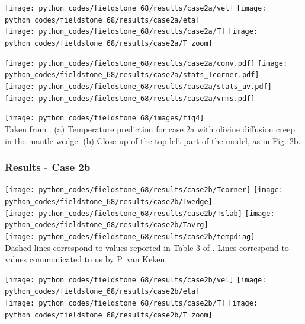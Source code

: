 \begin{center}
\texttt{[image: python\_codes/fieldstone\_68/results/case2a/vel]}
\texttt{[image: python\_codes/fieldstone\_68/results/case2a/eta]}\\
\texttt{[image: python\_codes/fieldstone\_68/results/case2a/T]}
\texttt{[image: python\_codes/fieldstone\_68/results/case2a/T\_zoom]}
\end{center}

\begin{center}
\texttt{[image: python\_codes/fieldstone\_68/results/case2a/conv.pdf]}
\texttt{[image: python\_codes/fieldstone\_68/results/case2a/stats\_Tcorner.pdf]}\\
\texttt{[image: python\_codes/fieldstone\_68/results/case2a/stats\_uv.pdf]}
\texttt{[image: python\_codes/fieldstone\_68/results/case2a/vrms.pdf]}
\end{center}


\begin{center}
\texttt{[image: python\_codes/fieldstone\_68/images/fig4]}\\
{\captionfont Taken from \cite{vack08}. 
(a) Temperature prediction for case 2a with olivine diffusion creep in 
the mantle wedge. (b) Close up of the top left part of the model, as in Fig. 2b.}
\end{center}

\newpage
\subsubsection*{Results - Case 2b}

\begin{center}
\texttt{[image: python\_codes/fieldstone\_68/results/case2b/Tcorner]}
\texttt{[image: python\_codes/fieldstone\_68/results/case2b/Twedge]}\\
\texttt{[image: python\_codes/fieldstone\_68/results/case2b/Tslab]}
\texttt{[image: python\_codes/fieldstone\_68/results/case2b/Tavrg]}\\
\texttt{[image: python\_codes/fieldstone\_68/results/case2b/tempdiag]}\\
{\captionfont Dashed lines correspond to values reported in Table 3 of \cite{vack08}.
Lines correspond to values communicated to us by P. van Keken.}
\end{center}

\begin{center}
\texttt{[image: python\_codes/fieldstone\_68/results/case2b/vel]}
\texttt{[image: python\_codes/fieldstone\_68/results/case2b/eta]}\\
\texttt{[image: python\_codes/fieldstone\_68/results/case2b/T]}
\texttt{[image: python\_codes/fieldstone\_68/results/case2b/T\_zoom]}
\end{center}

